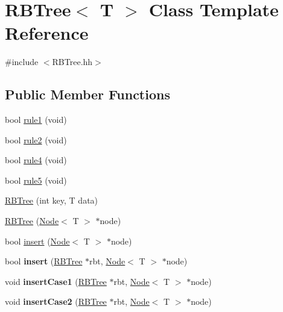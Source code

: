 \hypertarget{class_r_b_tree}{}\section{R\+B\+Tree$<$ T $>$ Class Template Reference}
\label{class_r_b_tree}


{\ttfamily \#include $<$R\+B\+Tree.\+hh$>$}

\subsection*{Public Member Functions}
\begin{DoxyCompactItemize}
\item 
bool \hyperlink{class_r_b_tree_ac5ef6ef34686c9e1036c35d3bf56f8cf}{rule1} (void)
\item 
bool \hyperlink{class_r_b_tree_a922765a4307e414802cb20bf9f405f7e}{rule2} (void)
\item 
bool \hyperlink{class_r_b_tree_acc448bf2bc24f8fdb83d293dca4f4810}{rule4} (void)
\item 
bool \hyperlink{class_r_b_tree_ad37bc2fd3c7b14c5d49862d4a3377b76}{rule5} (void)
\item 
\hyperlink{class_r_b_tree_a743575c444246d79b343bf7f8090eb9f}{R\+B\+Tree} (int key, T data)
\item 
\hyperlink{class_r_b_tree_afd8831000cdef5cd6215e17d0684f6f1}{R\+B\+Tree} (\hyperlink{class_node}{Node}$<$ T $>$ $\ast$node)
\item 
bool \hyperlink{class_r_b_tree_a8f67ba964a14d252ff6851a46576399e}{insert} (\hyperlink{class_node}{Node}$<$ T $>$ $\ast$node)
\item 
\hypertarget{class_r_b_tree_aa3450616177356179bbd79dd043c61a2}{}bool {\bfseries insert} (\hyperlink{class_r_b_tree}{R\+B\+Tree} $\ast$rbt, \hyperlink{class_node}{Node}$<$ T $>$ $\ast$node)\label{class_r_b_tree_aa3450616177356179bbd79dd043c61a2}

\item 
\hypertarget{class_r_b_tree_aca1969f82829cc4d8145899a9ef0eb18}{}void {\bfseries insert\+Case1} (\hyperlink{class_r_b_tree}{R\+B\+Tree} $\ast$rbt, \hyperlink{class_node}{Node}$<$ T $>$ $\ast$node)\label{class_r_b_tree_aca1969f82829cc4d8145899a9ef0eb18}

\item 
\hypertarget{class_r_b_tree_a5379cd21ee5e267de94358fd8ba18949}{}void {\bfseries insert\+Case2} (\hyperlink{class_r_b_tree}{R\+B\+Tree} $\ast$rbt, \hyperlink{class_node}{Node}$<$ T $>$ $\ast$node)\label{class_r_b_tree_a5379cd21ee5e267de94358fd8ba18949}


\end{DoxyCompactItemize}
